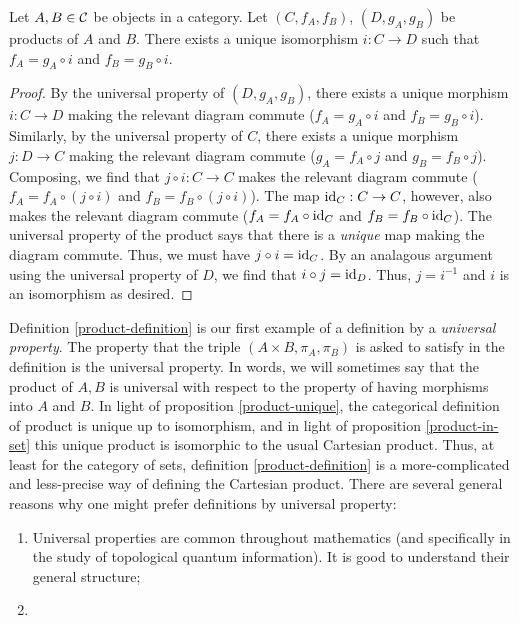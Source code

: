 \begin{prop}\label{product-unique} Let $A,B\in{\mathcal C}$ be objects in a category. Let $(C,f_A,f_B)$, $(D,g_A,g_B)$ be products of $A$ and $B$. There exists a unique isomorphism $i:C\to D$ such that $f_A= g_A\circ i$ and $f_B=g_B\circ i$.
\end{prop}
\begin{proof} By the universal property of $(D,g_A,g_B)$, there exists a unique morphism $i:C\to D$ making the relevant diagram commute ($f_A= g_A\circ i$ and $f_B=g_B\circ i$). Similarly, by the universal property of $C$, there exists a unique morphism $j:D\to C$ making the relevant diagram commute ($g_A= f_A\circ j$ and $g_B=f_B\circ j$). Composing, we find that $j\circ i:C\to C$ makes the relevant diagram commute ($f_A=f_A\circ (j\circ i)$ and $f_B=f_B\circ (j\circ i)$). The map $\operatorname{id}_C:C\to C$, however, also makes the relevant diagram commute ($f_A=f_A\circ \operatorname{id}_C$ and $f_B=f_B\circ \operatorname{id}_C$). The universal property of the product says that there is a {\em unique} map making the diagram commute. Thus, we must have $j\circ i =\operatorname{id}_C$. By an analagous argument using the universal property of $D$, we find that $i\circ j=\operatorname{id}_D$. Thus, $j=i^{-1}$ and $i$ is an isomorphism as desired.
\end{proof}

\begin{rem} Definition \ref{product-definition} is our first example of a definition by a {\em universal property}. The property that the triple $(A\times B,\pi_A,\pi_B)$ is asked to satisfy in the definition is the universal property. In words, we will sometimes say that the product of $A,B$ is universal with respect to the property of having morphisms into $A$ and $B$. In light of proposition \ref{product-unique}, the categorical definition of product is unique up to isomorphism, and in light of proposition \ref{product-in-set} this unique product is isomorphic to the usual Cartesian product. Thus, at least for the category of sets, definition \ref{product-definition} is a more-complicated and less-precise way of defining the Cartesian product. There are several general reasons why one might prefer definitions by universal property:

\begin{enumerate}
\item Universal properties are common throughout mathematics (and specifically in the study of topological quantum information). It is good to understand their general structure;
\item {}
\end{enumerate}
\end{rem}

